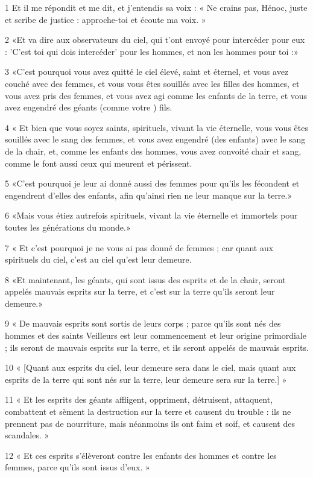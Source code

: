 
\par 1 Et il me répondit et me dit, et j'entendis sa voix : « Ne crains pas, Hénoc, juste et scribe de justice : approche-toi et écoute ma voix. »
\par 2 «Et va dire aux observateurs du ciel, qui t'ont envoyé pour intercéder pour eux : 'C'est toi qui dois intercéder' pour les hommes, et non les hommes pour toi :»
\par 3 «C'est pourquoi vous avez quitté le ciel élevé, saint et éternel, et vous avez couché avec des femmes, et vous vous êtes souillés avec les filles des hommes, et vous avez pris des femmes, et vous avez agi comme les enfants de la terre, et vous avez engendré des géants (comme votre ) fils.
\par 4 « Et bien que vous soyez saints, spirituels, vivant la vie éternelle, vous vous êtes souillés avec le sang des femmes, et vous avez engendré (des enfants) avec le sang de la chair, et, comme les enfants des hommes, vous avez convoité chair et sang, comme le font aussi ceux qui meurent et périssent.
\par 5 «C'est pourquoi je leur ai donné aussi des femmes pour qu'ils les fécondent et engendrent d'elles des enfants, afin qu'ainsi rien ne leur manque sur la terre.»
\par 6 «Mais vous étiez autrefois spirituels, vivant la vie éternelle et immortels pour toutes les générations du monde.»
\par 7 « Et c’est pourquoi je ne vous ai pas donné de femmes ; car quant aux spirituels du ciel, c’est au ciel qu’est leur demeure.
\par 8 «Et maintenant, les géants, qui sont issus des esprits et de la chair, seront appelés mauvais esprits sur la terre, et c'est sur la terre qu'ils seront leur demeure.»
\par 9 « De mauvais esprits sont sortis de leurs corps ; parce qu'ils sont nés des hommes et des saints Veilleurs est leur commencement et leur origine primordiale ; ils seront de mauvais esprits sur la terre, et ils seront appelés de mauvais esprits.
\par 10 « [Quant aux esprits du ciel, leur demeure sera dans le ciel, mais quant aux esprits de la terre qui sont nés sur la terre, leur demeure sera sur la terre.] »
\par 11 « Et les esprits des géants affligent, oppriment, détruisent, attaquent, combattent et sèment la destruction sur la terre et causent du trouble : ils ne prennent pas de nourriture, mais néanmoins ils ont faim et soif, et causent des scandales. »
\par 12 « Et ces esprits s'élèveront contre les enfants des hommes et contre les femmes, parce qu'ils sont issus d'eux. »

